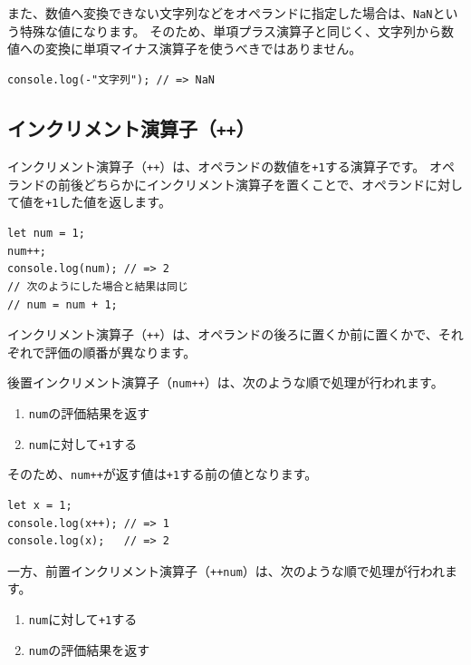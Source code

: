 また、数値へ変換できない文字列などをオペランドに指定した場合は、\texttt{NaN}という特殊な値になります。
そのため、単項プラス演算子と同じく、文字列から数値への変換に単項マイナス演算子を使うべきではありません。

\begin{lstlisting}
console.log(-"文字列"); // => NaN
\end{lstlisting}

\hypertarget{increment-operator}{%
\subsection{\texorpdfstring{インクリメント演算子（\texttt{++}）}{インクリメント演算子（++）}}\label{increment-operator}}

インクリメント演算子（\texttt{++}）は、オペランドの数値を\texttt{+1}する演算子です。
オペランドの前後どちらかにインクリメント演算子を置くことで、オペランドに対して値を\texttt{+1}した値を返します。

\begin{lstlisting}
let num = 1;
num++;
console.log(num); // => 2
// 次のようにした場合と結果は同じ
// num = num + 1;
\end{lstlisting}

インクリメント演算子（\texttt{++}）は、オペランドの後ろに置くか前に置くかで、それぞれで評価の順番が異なります。

後置インクリメント演算子（\texttt{num++}）は、次のような順で処理が行われます。

\begin{enumerate}
\def\labelenumi{\arabic{enumi}.}
\item
  \texttt{num}の評価結果を返す
\item
  \texttt{num}に対して\texttt{+1}する
\end{enumerate}

そのため、\texttt{num++}が返す値は\texttt{+1}する前の値となります。

\begin{lstlisting}
let x = 1;
console.log(x++); // => 1
console.log(x);   // => 2
\end{lstlisting}

一方、前置インクリメント演算子（\texttt{++num}）は、次のような順で処理が行われます。

\begin{enumerate}
\def\labelenumi{\arabic{enumi}.}
\item
  \texttt{num}に対して\texttt{+1}する
\item
  \texttt{num}の評価結果を返す
\end{enumerate}

